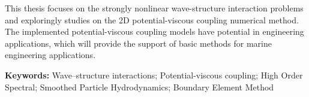 \begin{enabstract}
This thesis focuses on the strongly nonlinear wave-structure interaction problems 
and exploringly studies on the 2D potential-viscous coupling numerical method. 
The implemented potential-viscous coupling models have potential in engineering applications, 
which will provide the support of basic methods for marine engineering applications.

\par\mbox{}\par %
\textbf{Keywords: }
Wave–structure interactions; 
Potential-viscous coupling; 
High Order Spectral; 
Smoothed Particle Hydrodynamics; 
Boundary Element Method

\end{enabstract}